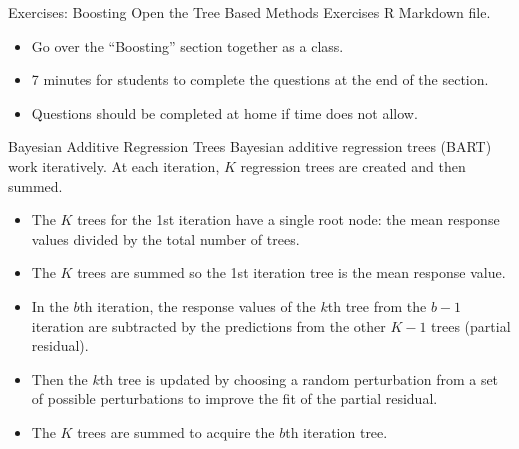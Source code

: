 \documentclass[
  ignorenonframetext,
  aspectratio=169,
]{beamer}
\begin{document}
\begin{frame}{Exercises: Boosting}
\protect\hypertarget{exercises-boosting}{}
Open the Tree Based Methods Exercises R Markdown file.

\begin{itemize}
\item
  Go over the ``Boosting'' section together as a class.
\item
  7 minutes for students to complete the questions at the end of the
  section.
\item
  Questions should be completed at home if time does not allow.
\end{itemize}
\end{frame}

\begin{frame}{Bayesian Additive Regression Trees}
\protect\hypertarget{bayesian-additive-regression-trees}{}
Bayesian additive regression trees (BART) work iteratively. At each
iteration, \(K\) regression trees are created and then summed.

\begin{itemize}
\item
  The \(K\) trees for the 1st iteration have a single root node: the
  \alert{mean response values divided by the total number of trees.}
\item
  The \alert{$K$ trees are summed} so the 1st iteration tree is the mean
  response value.
\item
  In the \(b\)th iteration, the response values of the \(k\)th tree from
  the \(b-1\) iteration are
  \alert{subtracted by the predictions from the other $K-1$ trees}
  (partial residual).
\item
  Then the \(k\)th tree is updated by choosing a
  \alert{random perturbation} from a set of possible perturbations to
  improve the fit of the partial residual.
\item
  The \alert{$K$ trees are summed} to acquire the \(b\)th iteration
  tree.
\end{itemize}
\end{frame}
\end{document}
